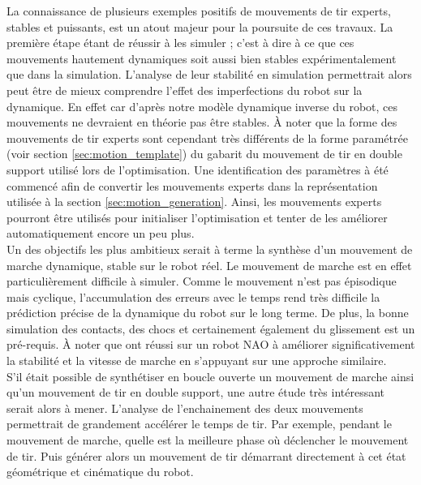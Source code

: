 La connaissance de plusieurs exemples \og positifs \fg de mouvements de tir
experts, stables et puissants, est un atout majeur pour la poursuite de ces travaux.
La première étape étant de réussir à les simuler ; c'est à dire à ce que
ces mouvements hautement dynamiques soit aussi bien stables expérimentalement
que dans la simulation.
L'analyse de leur stabilité en simulation permettrait alors peut être
de mieux comprendre l'effet des imperfections du robot sur la dynamique.
En effet car d'après notre modèle dynamique inverse du robot, 
ces mouvements ne devraient en théorie pas être stables.
À noter que la forme des mouvements de tir experts sont cependant
très différents de la forme paramétrée (voir section \ref{sec:motion_template}) 
du gabarit du mouvement de tir en double support utilisé lors de l'optimisation.
Une identification des paramètres à été commencé afin de \og convertir \fg
les mouvements experts dans la représentation utilisée à la section \ref{sec:motion_generation}.
Ainsi, les mouvements experts pourront être utilisés pour initialiser l'optimisation
et tenter de les améliorer automatiquement encore un peu plus.\\

Un des objectifs les plus ambitieux serait à terme la synthèse 
d'un mouvement de marche dynamique, stable sur le robot réel.
Le mouvement de marche est en effet particulièrement difficile à 
simuler. Comme le mouvement n'est pas épisodique mais cyclique, 
l'accumulation des erreurs avec le temps rend très difficile
la prédiction précise de la dynamique du robot sur le long terme.
De plus, la bonne simulation des contacts, des chocs et certainement 
également du glissement est un pré-requis.
À noter que \cite{hanna_grounded_2017} ont réussi sur un robot NAO
à améliorer significativement la stabilité et la vitesse de marche 
en s'appuyant sur une approche similaire.\\

S'il était possible de synthétiser en boucle ouverte un mouvement
de marche ainsi qu'un mouvement de tir en double support,
une autre étude très intéressant serait alors à mener.
L'analyse de l'enchainement des deux mouvements permettrait
de grandement accélérer le temps de tir.
Par exemple, pendant le mouvement de marche, quelle est la meilleure 
phase où déclencher le mouvement de tir. Puis générer alors 
un mouvement de tir démarrant directement à cet état géométrique 
et cinématique du robot.\\

